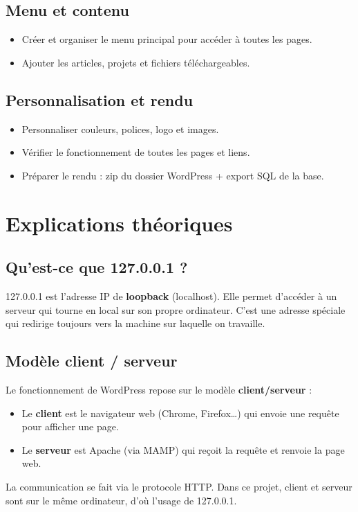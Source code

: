 \documentclass[a4paper,12pt]{article}
\begin{document}
\subsection*{Menu et contenu}
\begin{itemize}
    \item Créer et organiser le menu principal pour accéder à toutes les pages.
    \item Ajouter les articles, projets et fichiers téléchargeables.
\end{itemize}

\subsection*{Personnalisation et rendu}
\begin{itemize}
    \item Personnaliser couleurs, polices, logo et images.
    \item Vérifier le fonctionnement de toutes les pages et liens.
    \item Préparer le rendu : zip du dossier WordPress + export SQL de la base.
\end{itemize}

\section{Explications théoriques}

\subsection*{Qu’est-ce que 127.0.0.1 ?}
127.0.0.1 est l’adresse IP de \textbf{loopback} (localhost). 
Elle permet d’accéder à un serveur qui tourne en local sur son propre ordinateur. 
C’est une adresse spéciale qui redirige toujours vers la machine sur laquelle on travaille.

\subsection*{Modèle client / serveur}
Le fonctionnement de WordPress repose sur le modèle \textbf{client/serveur} :
\begin{itemize}
    \item Le \textbf{client} est le navigateur web (Chrome, Firefox…) qui envoie une requête 
    pour afficher une page.
    \item Le \textbf{serveur} est Apache (via MAMP) qui reçoit la requête et renvoie la page web.
\end{itemize}
La communication se fait via le protocole HTTP. Dans ce projet, client et serveur 
sont sur le même ordinateur, d’où l’usage de 127.0.0.1.
\end{document}
